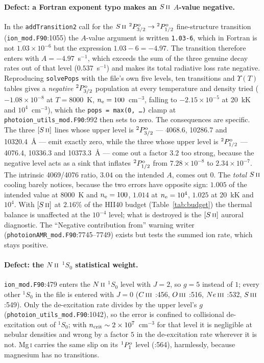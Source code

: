 \documentclass[english,a4paper]{my_memo}
\newcommand{\code}[1]{\texttt{#1}}
\newcommand{\OIII}{O\,\textsc{iii}}
\newcommand{\NII}{N\,\textsc{ii}}
\newcommand{\CIII}{C\,\textsc{iii}}
\newcommand{\SII}{S\,\textsc{ii}}
\newcommand{\SIII}{S\,\textsc{iii}}
\newcommand{\NeIII}{Ne\,\textsc{iii}}
\newcommand{\nel}{n_{\rm e}}
\newcommand{\ncrit}{n_{\rm crit}}
\begin{document}
\paragraph{Defect: a Fortran exponent typo makes an $\SII{}$ $A$-value
negative.}  In the \code{addTransition2} call for the $\SII{}$
$^2P^{\rm o}_{3/2} \to {}^2P^{\rm o}_{1/2}$ fine-structure transition
(\code{ion\_mod.F90}:1055) the $A$-value argument is written \code{1.03-6},
which in Fortran is not $1.03\times10^{-6}$ but the expression
$1.03 - 6 = -4.97$.  The transition therefore enters with
$A = -4.97$~s$^{-1}$, which exceeds the sum of the three genuine decay rates
out of that level ($0.537$~s$^{-1}$) and makes its total radiative loss rate
negative.  Reproducing \code{solvePops} with the file's own five levels, ten
transitions and $\Upsilon(T)$ tables gives a \emph{negative}
$^2P^{\rm o}_{3/2}$ population at every temperature and density tried
($-1.08\times10^{-8}$ at $T = 8000$~K, $\nel = 100$~cm$^{-3}$, falling to
$-2.15\times10^{-5}$ at 20~kK and $10^4$~cm$^{-3}$), which the
\code{pops = max(0, \dots)} clamp at \code{photoion\_utils\_mod.F90}:992 then
sets to zero.  The consequences are specific.  The three $[\SII{}]$ lines whose
upper level is $^2P^{\rm o}_{3/2}$ --- 4068.6, 10286.7 and 10320.4~\AA{} ---
emit exactly zero, while the three whose upper level is
$^2P^{\rm o}_{1/2}$ --- 4076.4, 10336.3 and 10373.3~\AA{} --- come out a factor
$3.2$ too strong, because the negative level acts as a sink that inflates
$^2P^{\rm o}_{1/2}$ from $7.28\times10^{-8}$ to $2.34\times10^{-7}$.  The
intrinsic 4069/4076 ratio, $3.04$ on the intended $A$, comes out $0$.  The
\emph{total} $\SII{}$ cooling barely notices, because the two errors have
opposite sign: $1.005$ of the intended value at 8000~K and $\nel = 100$,
$1.014$ at $\nel = 10^4$, $1.025$ at 20~kK and $10^4$.  With $[\SII{}]$ at
$2.16\%$ of the HII40 budget (Table~\ref{tab:budget}) the thermal balance is
unaffected at the $10^{-4}$ level; what is destroyed is the $[\SII{}]$ auroral
diagnostic.  The ``Negative contribution from'' warning writer
(\code{photoionAMR\_mod.F90}:7745--7749) exists but tests the summed ion rate,
which stays positive.

\paragraph{Defect: the $\NII{}$ $^1S_0$ statistical weight.}
\code{ion\_mod.F90}:479 enters the $\NII{}$ $^1S_0$ level with $J = 2$, so
$g = 5$ instead of $1$; every other $^1S_0$ in the file is entered with
$J = 0$ ($\CIII{}$ :456, $\OIII{}$ :516, $\NeIII{}$ :532, $\SIII{}$ :549).
Only the de-excitation rate divides by the upper level's $g$
(\code{photoion\_utils\_mod.F90}:1042), so the error is confined to
collisional de-excitation out of $^1S_0$; with
$\ncrit \sim 2\times10^{7}$~cm$^{-3}$ for that level it is negligible at
nebular densities and wrong by a
factor $5$ in the de-excitation rate wherever it is not.  Mg\,\textsc{i}
carries the same slip on its $^1P^{\rm o}_1$ level (:564), harmlessly, because
magnesium has no transitions.
\end{document}
